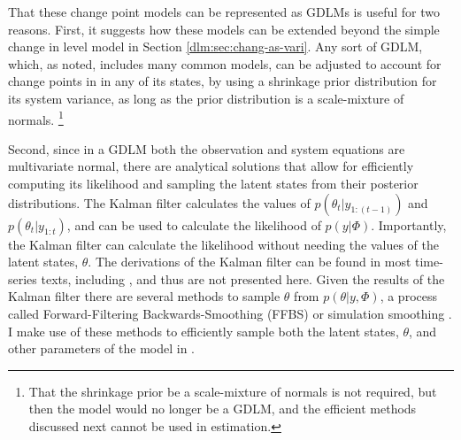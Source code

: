 \documentclass[12pt]{article}
\begin{document}
That these change point models can be represented as GDLMs is useful for two reasons.
First, it suggests how these models can be extended beyond the simple change in level model in Section \ref{dlm:sec:chang-as-vari}.
Any sort of GDLM, which, as noted, includes many common models, can be adjusted to account for change points in in any of its states, by using a shrinkage prior distribution for its system variance, as long as the prior distribution is a scale-mixture of normals.%
\footnote{That the shrinkage prior be a scale-mixture of normals is not required, but then the model would no longer be a GDLM, and the efficient methods discussed next cannot be used in estimation.}

Second, since in a GDLM both the observation and system equations are multivariate normal, there are analytical solutions that allow for efficiently computing its likelihood and sampling the latent states from their posterior distributions.
The Kalman filter calculates the values of $p(\theta_{t} | y_{1:(t-1)})$  and $p(\theta_{t}| y_{1:t})$, and can be used to calculate the likelihood of $p(y | \Phi)$.
Importantly, the Kalman filter can calculate the likelihood without needing the values of the latent states, $\theta$.
The derivations of the Kalman filter can be found in most time-series texts, including \textcites[Ch. 5--7]{DurbinKoopman2012}{WestHarrison1997}, and thus are not presented here.
Given the results of the Kalman filter there are several methods to sample $\theta$ from $p(\theta | y, \Phi)$, a process called Forward-Filtering Backwards-Smoothing (FFBS) or simulation smoothing \parencites{CarterKohn1994}{Fruehwirth-Schnatter1994}{DeJongShephard1995}{DurbinKoopman2002}[Ch 4.9]{DurbinKoopman2012}.
I make use of these methods to efficiently sample both the latent states, $\theta$, and other parameters of the model in \Stan{}.
\end{document}
